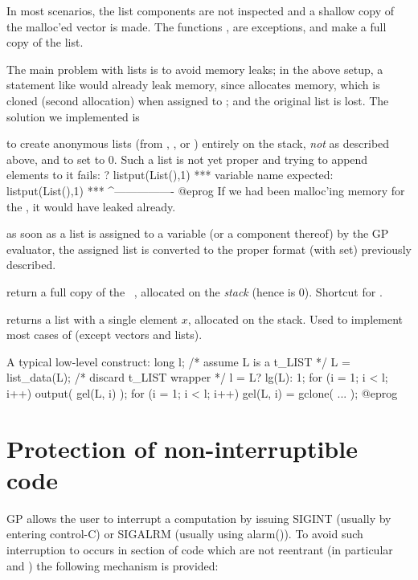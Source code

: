 In most  scenarios, the list components are not inspected
and a shallow copy of the malloc'ed vector is made. The functions
,  are exceptions, and make a full copy of
the list.

The main problem with lists is to avoid memory leaks; in the above setup,
a statement like  would already leak memory, since
 allocates memory, which is cloned (second allocation) when
assigned to ; and the original list is lost. The solution we
implemented is

\item to create anonymous lists (from , ,
 or ) entirely on the stack, \emph{not} as described
above, and to set  to $0$. Such a list is not yet proper and
trying to append elements to it fails:
\bprog
? listput(List(),1)
  ***   variable name expected: listput(List(),1)
  ***                                   ^----------------
@eprog\noindent
If we had been malloc'ing memory for the
, it would have leaked already.

\item as soon as a list is assigned to a variable (or a component thereof)
by the GP evaluator, the assigned list is converted to the proper format
(with  set) previously described.

 return a full copy of the ~,
allocated on the \emph{stack} (hence  is $0$). Shortcut for
.

 returns a list with a single element $x$,
allocated on the stack. Used to implement most cases of 
(except vectors and lists).

A typical low-level construct:
\bprog
  long l;
  /* assume L is a t_LIST */
  L = list_data(L); /* discard t_LIST wrapper */
  l = L? lg(L): 1;
  for (i = 1; i < l; i++) output( gel(L, i) );
  for (i = 1; i < l; i++) gel(L, i) = gclone( ... );
@eprog\noindent

\section{Protection of non-interruptible code}

GP allows the user to interrupt a computation by issuing SIGINT
(usually by entering control-C) or SIGALRM (usually using alarm()).
To avoid such interruption to occurs in section of code which are not
reentrant (in particular  and )
the following mechanism is provided:

